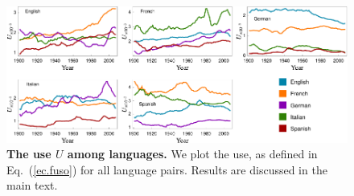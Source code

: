 \documentclass[10pt,letterpaper]{article} %
\newcommand{\eref}[1]{Eq.~(\ref{#1})}
\begin{document}





\begin{figure}[!h]
	\begin{adjustwidth}{-2cm}{1cm}
		\centering
		\includegraphics{images/usoFinal.pdf}
		\caption{{\bf The use $U$ among languages.} 
We plot the use, as defined in \eref{ec.fuso} for all language pairs. 
Results are discussed in the
main text. }
		\label{fig.UT_art}
	\end{adjustwidth}
\end{figure}
\end{document}
